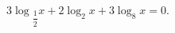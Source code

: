 \begin{ex}[type=equation]
	\begin{condition}
		$3\log$\tiny$_{\dfrac{1}{2}}$\normalsize$ x + 2\log_2 x + 3\log_8 x = 0 .$
	\end{condition}
\end{ex}